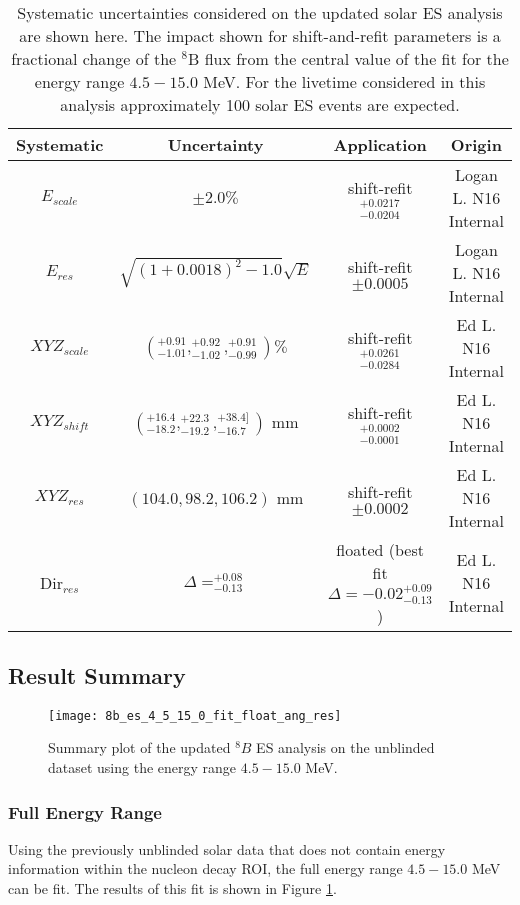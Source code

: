 \begin{table}[]
\begin{center}
\begin{tabular}{c|c|c|c}
Systematic & Uncertainty & Application & Origin \\ \hline
$E_{scale}$     & $\pm 2.0\%$ & shift-refit $^{+0.0217}_{-0.0204}$ & Logan L. N16 Internal \rule{0pt}{2.6ex}\rule[-1.2ex]{0pt}{0pt}  \\
$E_{res}$       & $\sqrt{(1+0.0018)^2-1.0}\sqrt{E}$ & shift-refit $\pm 0.0005$ & Logan L. N16 Internal  \rule{0pt}{2.6ex}\rule[-1.2ex]{0pt}{0pt}  \\
${XYZ}_{scale}$ & $(^{+0.91}_{-1.01},^{+0.92}_{-1.02},^{+0.91}_{-0.99}) \%$ & shift-refit $^{+0.0261}_{-0.0284}$ & Ed L. N16 Internal  \rule{0pt}{2.6ex}\rule[-1.2ex]{0pt}{0pt}  \\
${XYZ}_{shift}$ & $(^{+16.4}_{-18.2},^{+22.3}_{-19.2},^{+38.4]}_{-16.7})$ mm & shift-refit $^{+0.0002}_{-0.0001}$ & Ed L. N16 Internal  \rule{0pt}{2.6ex}\rule[-1.2ex]{0pt}{0pt}  \\
${XYZ}_{res}$ & $(104.0,98.2,106.2)$ mm & shift-refit $\pm 0.0002$ & Ed L. N16 Internal  \rule{0pt}{2.6ex}\rule[-1.2ex]{0pt}{0pt}  \\
Dir$_{res}$     &  $\Delta = ^{+0.08}_{-0.13}$ & floated (best fit $\Delta = -0.02^{+0.09}_{-0.13}$) & Ed L. N16 Internal \rule{0pt}{2.6ex}\rule[-1.2ex]{0pt}{0pt}  \\ \hline
\end{tabular}
\caption{ Systematic uncertainties considered on the updated solar ES analysis are shown here. 
The impact shown for shift-and-refit parameters is a fractional change of the $^8$B flux from the central value of the fit for the energy range $4.5-15.0$ MeV.
For the livetime considered in this analysis approximately 100 solar ES events are expected.}
\label{tbl:solar:updated_syst}
\end{center}
\end{table}


\subsection{Result Summary}

\begin{figure}
\centering
\texttt{[image: 8b\_es\_4\_5\_15\_0\_fit\_float\_ang\_res]}
\caption{Summary plot of the updated $^8B$ ES analysis on the unblinded dataset using the energy range $4.5-15.0$ MeV.}
\label{fig:solar:unpdated_fit_4.5}
\end{figure}

\subsubsection{Full Energy Range}
Using the previously unblinded solar data that does not contain energy information within the nucleon decay ROI, the full energy range $4.5-15.0$ MeV can be fit. 
The results of this fit is shown in Figure \ref{fig:solar:unpdated_fit_4.5}.
